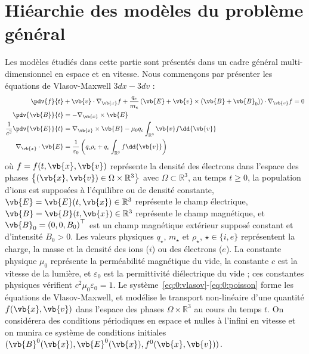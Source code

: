 
\section{Hiéarchie des modèles du problème général}
\label{sec:0:model}

Les modèles étudiés dans cette partie sont présentés dans un cadre général multi-dimensionnel en espace et en vitesse. Nous commençons par présenter les équations de Vlasov-Maxwell $3dx-3dv$ :
\begin{align}
  \label{eq:0:vlasov}
    \pdv{f}{t} &+ \vb{v}\cdot\nabla_{\vb{x}} f + \frac{q_e}{m_e}\left( \vb{E} + \vb{v}\times(\vb{B}+\vb{B}_0) \right)\cdot\nabla_{\vb{v}} f = 0 \\
  \label{eq:0:maxwellB}
    \pdv{\vb{B}}{t} &= - \nabla_{\vb{x}}\times\vb{E} \\
  \label{eq:0:maxwellE}
    \frac{1}{c^2}\pdv{\vb{E}}{t} &= \nabla_{\vb{x}}\times \vb{B} - \mu_0 q_e\int_{\mathbb{R}^3} \vb{v} f\dd{\vb{v}} \\
  \label{eq:0:poisson}
    \nabla_{\vb{x}}\cdot\vb{E} &= \frac{1}{\varepsilon_0}\left( q_i\rho_i + q_e\int_{\mathbb{R}^3} f\dd{\vb{v}} \right)
\end{align}
où $f=f(t,\vb{x},\vb{v})$ représente la densité des électrons dans l'espace des phases $\left\{ (\vb{x},\vb{v}) \in \Omega\times\mathbb{R}^3 \right\}$ avec $\Omega\subset\mathbb{R}^3$, au temps $t\geq0$, la population d'ions est supposées à l'équilibre ou de densité constante, $\vb{E}=\vb{E}(t,\vb{x})\in\mathbb{R}^3$ représente le champ électrique, $\vb{B}=\vb{B}(t,\vb{x})\in\mathbb{R}^3$ représente le champ magnétique, et $\vb{B}_0 = \left(0,0,B_0\right)^\top$ est un champ magnétique extérieur supposé constant et d'intensité $B_0 > 0$. Les valeurs physiques $q_\star$, $m_\star$ et $\rho_\star$, $\star\in\{i,e\}$ représentent la charge, la masse et la densité des ions ($i$) ou des électrons ($e$). La constante physique $\mu_0$ représente la perméabilité magnétique du vide, la constante $c$ est la vitesse de la lumière, et $\varepsilon_0$ est la permittivité diélectrique du vide ; ces constantes physiques vérifient $c^2\mu_0\varepsilon_0=1$. Le système~\eqref{eq:0:vlasov}-\eqref{eq:0:poisson} forme les équations de Vlasov-Maxwell, et modélise le transport non-linéaire d'une quantité $f(\vb{x},\vb{v})$ dans l'espace des phases $\Omega\times\mathbb{R}^3$ au cours du temps $t$. On considérera des conditions périodiques en espace et nulles à l'infini en vitesse et on munira ce système de conditions initiales $(\vb{B}^0(\vb{x}),\vb{E}^0(\vb{x}),f^0(\vb{x},\vb{v}))$.

